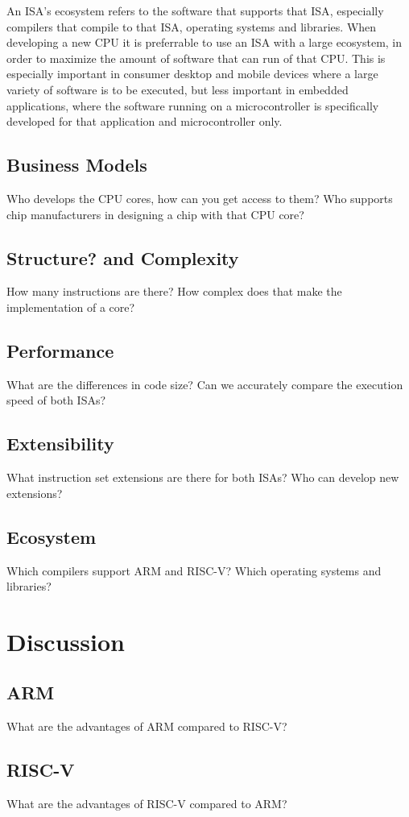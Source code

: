 \documentclass[conference]{IEEEtran}
\begin{document}
An \gls{ISA}'s ecosystem refers to the software that supports that \gls{ISA}, especially compilers that compile to that \gls{ISA}, operating systems and libraries.
When developing a new \gls{CPU} it is preferrable to use an \gls{ISA} with a large ecosystem, in order to maximize the amount of software
that can run of that \gls{CPU}. This is especially important in consumer desktop and mobile devices where a large variety of software is to be executed,
but less important in embedded applications, where the software running on a microcontroller is specifically developed for that application and microcontroller
only.

	\subsection{Business Models}
	Who develops the CPU cores, how can you get access to them? Who supports chip manufacturers in designing a chip with that CPU core?
	\subsection{Structure? and Complexity}
	How many instructions are there? How complex does that make the implementation of a core?
	\subsection{Performance}
	What are the differences in code size? Can we accurately compare the execution speed of both ISAs?
	\subsection{Extensibility}
	What instruction set extensions are there for both ISAs? Who can develop new extensions?
	\subsection{Ecosystem}
	Which compilers support ARM and RISC-V? Which operating systems and libraries?


\section{Discussion}
\label{ref:discussion}
	\subsection{ARM}
	What are the advantages of ARM compared to RISC-V?
	\subsection{RISC-V}
	What are the advantages of RISC-V compared to ARM?
\end{document}
